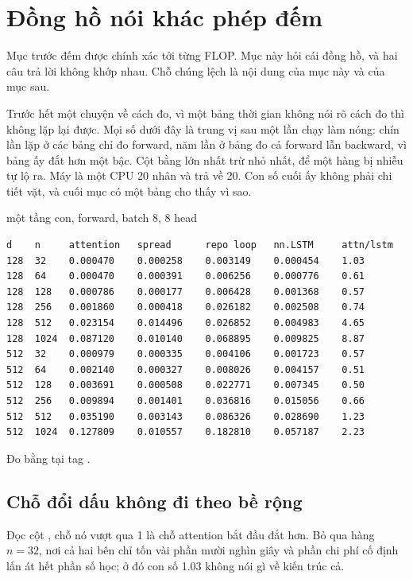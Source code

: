 \section{Đồng hồ nói khác phép đếm}
\label{sec:ch08-dong-ho}

%
Mục trước đếm được chính xác tới từng FLOP. Mục này hỏi cái đồng hồ, và hai câu
trả lời không khớp nhau. Chỗ chúng lệch là nội dung của mục này và của mục sau.

Trước hết một chuyện về cách đo, vì một bảng thời gian không nói rõ cách đo thì
không lặp lại được. Mọi số dưới đây là trung vị sau một lần chạy làm nóng: chín
lần lặp ở các bảng chỉ đo forward, năm lần ở bảng đo cả forward lẫn backward, vì
bảng ấy đắt hơn một bậc. Cột  bằng lớn nhất trừ nhỏ nhất, để một
hàng bị nhiễu tự lộ ra. Máy là một CPU 20 nhân và  trả
về 20. Con số cuối ấy không phải chi tiết vặt, và cuối mục có một bảng cho thấy
vì sao.

\begin{measured}{một tầng con, forward, batch 8, 8 head}
\begin{verbatim}
d    n     attention   spread      repo loop   nn.LSTM     attn/lstm
128  32    0.000470    0.000258    0.003149    0.000454    1.03
128  64    0.000470    0.000391    0.006256    0.000776    0.61
128  128   0.000786    0.000177    0.006428    0.001368    0.57
128  256   0.001860    0.000418    0.026182    0.002508    0.74
128  512   0.023154    0.014496    0.026852    0.004983    4.65
128  1024  0.087120    0.010140    0.068895    0.009825    8.87
512  32    0.000979    0.000335    0.004106    0.001723    0.57
512  64    0.002140    0.000327    0.008026    0.004157    0.51
512  128   0.003691    0.000508    0.022771    0.007345    0.50
512  256   0.009894    0.001401    0.036816    0.015056    0.66
512  512   0.035190    0.003143    0.086326    0.028690    1.23
512  1024  0.127809    0.010557    0.182810    0.057187    2.23
\end{verbatim}

Đo bằng  tại tag .
\end{measured}

\subsection*{Chỗ đổi dấu không đi theo bề rộng}

%
Đọc cột , chỗ nó vượt qua 1 là chỗ attention bắt đầu đắt hơn.
Bỏ qua hàng \(n = 32\), nơi cả hai bên chỉ tốn vài phần mười nghìn giây và phần
chi phí cố định lấn át hết phần số học; ở đó con số 1.03 không nói gì về kiến
trúc cả.

